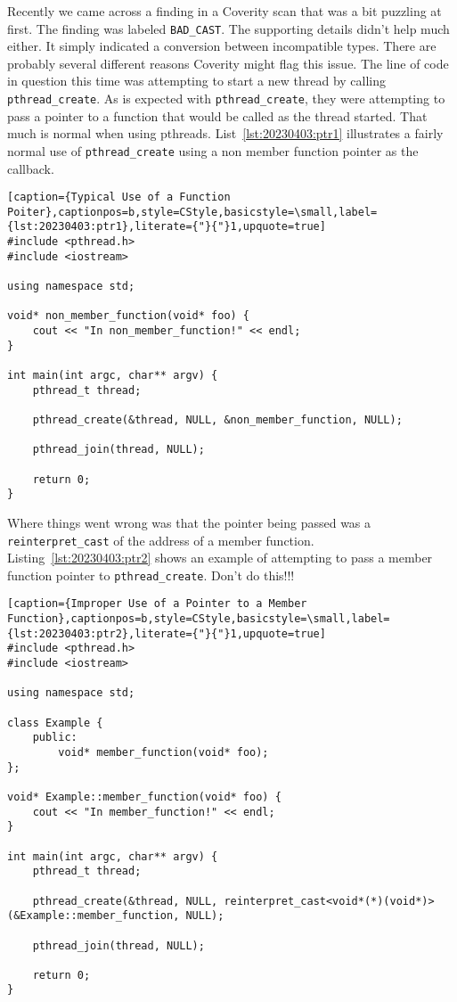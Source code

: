 Recently we came across a finding in a Coverity scan that was a bit puzzling at first. The finding was labeled \texttt{BAD\_CAST}. The supporting details didn’t help much either. It simply indicated a conversion between incompatible types. There are probably several different reasons Coverity might flag this issue. The line of code in question this time was attempting to start a new thread by calling \texttt{pthread\_create}. As is expected with \texttt{pthread\_create}, they were attempting to pass a pointer to a function that would be called as the thread started. That much is normal when using pthreads. List~\ref{lst:20230403:ptr1} illustrates a fairly normal use of \texttt{pthread\_create} using a non member function pointer as the callback.

\begin{lstlisting}[caption={Typical Use of a Function Poiter},captionpos=b,style=CStyle,basicstyle=\small,label={lst:20230403:ptr1},literate={"}{"}1,upquote=true]
#include <pthread.h>
#include <iostream>

using namespace std;

void* non_member_function(void* foo) {
	cout << "In non_member_function!" << endl;
}

int main(int argc, char** argv) {
	pthread_t thread;

	pthread_create(&thread, NULL, &non_member_function, NULL);

	pthread_join(thread, NULL);

	return 0;
}
\end{lstlisting}

Where things went wrong was that the pointer being passed was a \texttt{reinterpret\_cast} of the address of a member function. Listing~\ref{lst:20230403:ptr2} shows an example of attempting to pass a member function pointer to \texttt{pthread\_create}. Don't do this!!!

\begin{lstlisting}[caption={Improper Use of a Pointer to a Member Function},captionpos=b,style=CStyle,basicstyle=\small,label={lst:20230403:ptr2},literate={"}{"}1,upquote=true]
#include <pthread.h>
#include <iostream>

using namespace std;

class Example {
	public:
		void* member_function(void* foo);
};

void* Example::member_function(void* foo) {
	cout << "In member_function!" << endl;
}

int main(int argc, char** argv) {
	pthread_t thread;

	pthread_create(&thread, NULL, reinterpret_cast<void*(*)(void*)>(&Example::member_function, NULL);

	pthread_join(thread, NULL);

	return 0;
}
\end{lstlisting}

